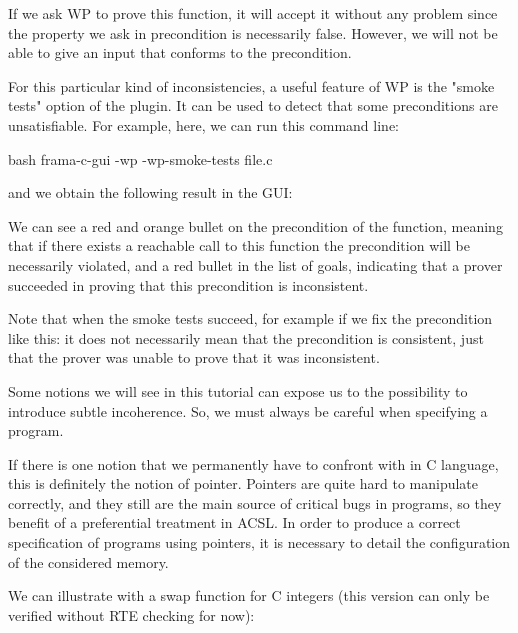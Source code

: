 

If we ask WP to prove this function, it will accept it without any problem
since the property we ask in precondition is necessarily false.
However, we will not be able to give an input that conforms to the
precondition.


For this particular kind of inconsistencies, a useful feature of WP is
the "smoke tests" option of the plugin. It can be used to detect that
some preconditions are unsatisfiable. For example, here, we can run this
command line:


\begin{CodeBlock}{bash}
  frama-c-gui -wp -wp-smoke-tests file.c
\end{CodeBlock}


and we obtain the following result in the GUI:




We can see a red and orange bullet on the precondition of the function,
meaning that if there exists a reachable call to this function the
precondition will be necessarily violated, and a red bullet in the
list of goals, indicating that a prover succeeded in proving that this
precondition is inconsistent.


Note that when the smoke tests succeed, for example if we fix the
precondition like this:
it does not necessarily mean that the precondition is consistent, just
that the prover was unable to prove that it was inconsistent.


Some notions we will see in this tutorial can expose us to the
possibility to introduce subtle incoherence. So, we must always be
careful when specifying a program.




If there is one notion that we permanently have to confront with in C
language, this is definitely the notion of pointer. Pointers are quite
hard to manipulate correctly, and they still are the main source of
critical bugs in programs, so they benefit of a preferential treatment
in ACSL. In order to produce a correct specification of programs using
pointers, it is necessary to detail the configuration of the considered
memory.

We can illustrate with a swap function for C integers (this version can
only be verified without RTE checking for now):






